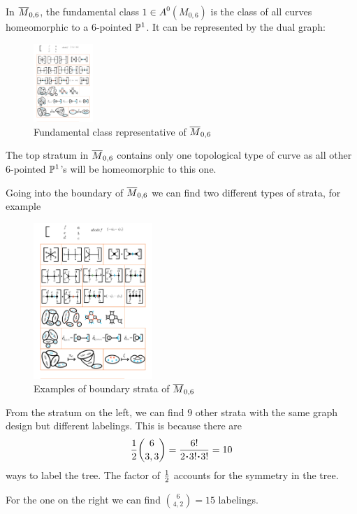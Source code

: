 \documentclass[12pt]{memoir}
\begin{document}
\begin{Ex}
    In $\overline M_{0,6}$, the fundamental class $1\in A^0(M_{0,6})$ is the class of all curves homeomorphic to a 6-pointed $\mathbb{P}^1$. It can be represented by the dual graph:\par
    \begin{figure}[h!]
        \centering
        \includegraphics[width=0.2\textwidth, trim= 1.32cm 20.75cm 16.53cm 3.9cm,clip]{figs/FigsDNnotability1.pdf}
        \caption{Fundamental class representative of $\overline{M}_{0,6}$}
        \label{fig:3.1-fundamental class}
    \end{figure} 
    The top stratum in $\overline M_{0,6}$ contains only one topological type of curve as all other $6$-pointed $\mathbb{P}^1$'s will be homeomorphic to this one.
\end{Ex}

\begin{Ex}
    Going into the boundary of $\overline M_{0,6}$ we can find two different types of strata, for example
    \begin{figure}[h!]
        \centering
        \includegraphics[width=0.4\textwidth, trim= 5.12cm 20.75cm 8.93cm 3.9cm,clip]{figs/FigsDNnotability1.pdf}
        \caption{Examples of boundary strata of $\overline{M}_{0,6}$}
        \label{fig:3.2-boundary-strata-M06c1}
    \end{figure} 
    From the stratum on the left, we can find $9$ other strata with the same graph design but different labelings. This is because there are 
    $$\half\binom{6}{3,3}=\frac{6!}{2\.3!\.3!}=10$$
    ways to label the tree. The factor of $\half$ accounts for the symmetry in the tree.\par
    For the one on the right we can find $\binom{6}{4,2}=15$ labelings.
\end{Ex}
\end{document}
